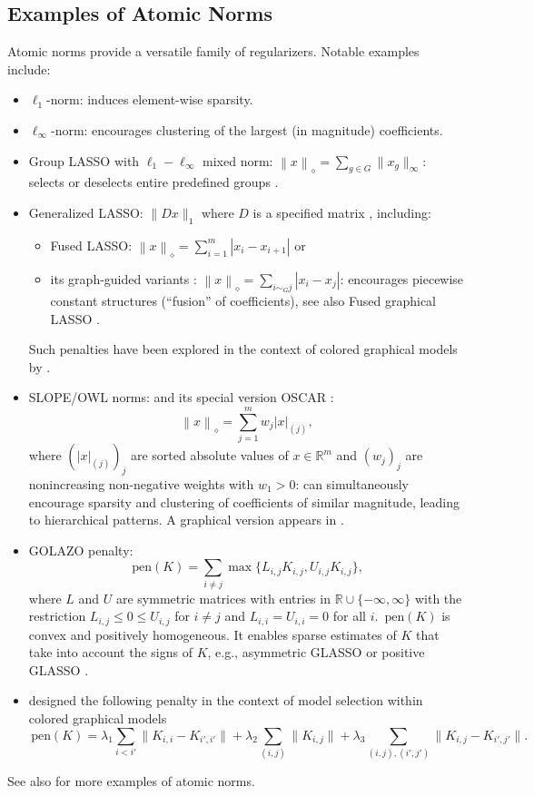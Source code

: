 \documentclass[12pt]{amsart}
\numberwithin{equation}{section}
\numberwithin{equation}{section}
\theoremstyle{definition}
\newcommand{\R}{\mathbb{R}}
\newcommand{\norm}{\,\mathrm{pen}}
\newcommand{\poly}[1]{\left\|#1\right\|_\diamond}
\begin{document}
\subsection{Examples of Atomic Norms}
Atomic norms provide a versatile family of regularizers. Notable examples include:
\begin{itemize}
	\item   $\ell_1$-norm: induces element-wise sparsity. 
	\item   $\ell_\infty$-norm: encourages clustering of the largest (in magnitude) coefficients.
	\item  Group LASSO with $\ell_1-\ell_\infty$ mixed norm:  $\poly{x} = \sum_{g \in G} \|x_g\|_{\infty}$: selects or deselects entire predefined groups   \cite{mixednorms,YuanLi07, Grlasso3}.
	\item Generalized LASSO: $\|Dx\|_1$ where $D$ is a specified matrix \cite{Tib11}, including:
\begin{itemize}
	\item Fused LASSO:  $\poly{x}= \sum_{i=1}^m |x_i-x_{i+1}|$ \cite{tibshirani2005sparsity} or 
	  \item its graph-guided variants \cite{GFLASSO}: $\poly{x}= \sum_{i\sim_G j} |x_i-x_{j}|$:  encourages piecewise constant structures (``fusion'' of coefficients),	see also Fused graphical LASSO \cite{fusedglasso, fusedMglasso}.  \end{itemize}
     Such penalties have been explored in the context of colored graphical models by \cite{GaoMassam15}.
	\item  SLOPE/OWL norms:  \cite{bogdan2015slope, figueiredo16} and its special version OSCAR \cite{OSCAR08}:
\[
\poly{x} =  \sum_{j=1}^m w_j |x|_{(j)}, 
\]
where $(|x|_{(j)})_j$ are sorted absolute values of $x\in\R^m$ and $(w_j)_j$ are  nonincreasing non-negative weights with $w_1>0$: can simultaneously encourage sparsity and clustering of coefficients of similar magnitude,  leading to hierarchical patterns. A graphical version appears in \cite{Mazza20,graphSLOPE}.
	\item GOLAZO penalty:
	\[
	\norm(K) = \sum_{i\neq j} \max\{L_{i,j} K_{i,j}, U_{i,j} K_{i,j}\},
	\]
	where $L$ and $U$ are symmetric matrices with entries in $\R\cup\{-\infty,\infty\}$ with the restriction  $L_{i,j}\leq 0\leq U_{i,j}$ for $i\neq j$ and $L_{i,i}=U_{i,i}=0$ for all $i$. $\norm(K)$ is convex and positively homogeneous. It enables sparse estimates of $K$ that take into account the signs of $K$, e.g., asymmetric GLASSO
    or positive GLASSO 
    \cite{GOLAZO}.
    \item \cite{LSWG21} designed the following penalty in the context of model selection within colored graphical models
    \[
    \norm(K)  = \lambda_1 \sum_{i<i'} \| K_{i,i}-K_{i',i'}\| + \lambda_2\sum_{(i,j)}\| K_{i,j}\|+\lambda_3 \sum_{(i,j),(i',j')} \|K_{i,j}-K_{i',j'}\|.
    \]
\end{itemize}
See also \cite{Chandra12} for more examples of atomic norms. 
\end{document}
